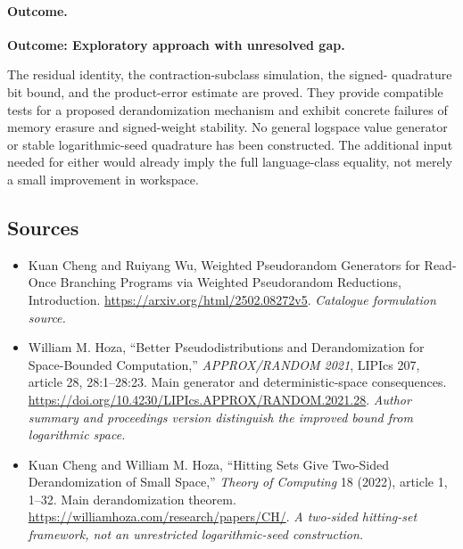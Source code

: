 \documentclass[11pt,a4paper]{article}
\numberwithin{equation}{section}
\begin{document}
\paragraph{Outcome.}
\textbf{Outcome: Exploratory approach with unresolved gap.}

The residual identity, the contraction-subclass simulation, the signed-
quadrature bit bound, and the product-error estimate are proved. They
provide compatible tests for a proposed derandomization mechanism and
exhibit concrete failures of memory erasure and signed-weight stability.
No general logspace value generator or stable logarithmic-seed quadrature
has been constructed. The additional input needed for either would
already imply the full language-class equality, not merely a small
improvement in workspace.

\subsection{Sources}
\begin{itemize}\raggedright
\item[\textnormal{[S1]}]\hypertarget{source:statement:1}{} Kuan Cheng and Ruiyang Wu, Weighted Pseudorandom Generators for Read-Once Branching Programs via Weighted Pseudorandom Reductions, Introduction.
\url{https://arxiv.org/html/2502.08272v5}.
{\small\textit{Catalogue formulation source.}}
\item[\textnormal{[E1]}]\hypertarget{extra:statement:1}{} William M. Hoza, ``Better Pseudodistributions and Derandomization for Space-Bounded Computation,'' \emph{APPROX/RANDOM 2021}, LIPIcs 207, article 28, 28:1--28:23. Main generator and deterministic-space consequences.
\url{https://doi.org/10.4230/LIPIcs.APPROX/RANDOM.2021.28}.
{\small\textit{Author summary and proceedings version distinguish the improved bound from logarithmic space.}}
\item[\textnormal{[E2]}]\hypertarget{extra:statement:2}{} Kuan Cheng and William M. Hoza, ``Hitting Sets Give Two-Sided Derandomization of Small Space,'' \emph{Theory of Computing} 18 (2022), article 1, 1--32. Main derandomization theorem.
\url{https://williamhoza.com/research/papers/CH/}.
{\small\textit{A two-sided hitting-set framework, not an unrestricted logarithmic-seed construction.}}
\end{itemize}
\end{document}
